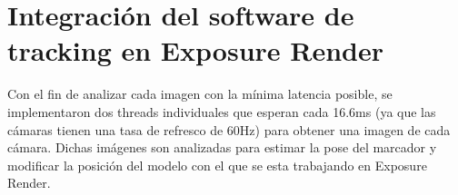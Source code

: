 \section{Integración del software de tracking en Exposure Render}
Con el fin de analizar cada imagen con la mínima latencia posible, se implementaron dos threads individuales que esperan cada 16.6ms (ya que las cámaras tienen una tasa de refresco de 60Hz) para obtener una imagen de cada cámara. Dichas imágenes son analizadas para estimar la pose del marcador y modificar la posición del modelo con el que se esta trabajando en Exposure Render.